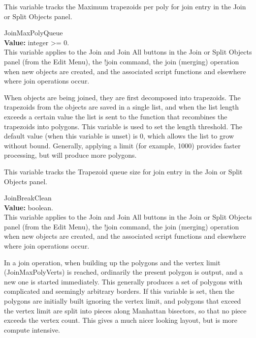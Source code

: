 \begin{description}
This variable tracks the {\cb Maximum trapezoids per poly for join}
entry in the {\cb Join or Split Objects} panel.

\item{\et JoinMaxPolyQueue}\\
{\bf Value:} integer {\vt >=} 0.\\
This variable applies to the {\cb Join} and {\cb Join All} buttons in
the {\cb Join or Split Objects} panel (from the {\cb Edit Menu}), the
{\cb !join} command, the join (merging) operation when new objects are
created, and the associated script functions and elsewhere where join
operations occur.

When objects are being joined, they are first decomposed into
trapezoids.  The trapezoids from the objects are saved in a single
list, and when the list length exceeds a certain value the list is
sent to the function that recombines the trapezoids into polygons. 
This variable is used to set the length threshold.  The default value
(when this variable is unset) is 0, which allows the list to grow
without bound.  Generally, applying a limit (for example, 1000)
provides faster processing, but will produce more polygons.

This variable tracks the {\cb Trapezoid queue size for join} entry in
the {\cb Join or Split Objects} panel.

\item{\et JoinBreakClean}\\
{\bf Value:} boolean.\\
This variable applies to the {\cb Join} and {\cb Join All} buttons in
the {\cb Join or Split Objects} panel (from the {\cb Edit Menu}), the
{\cb !join} command, the join (merging) operation when new objects are
created, and the associated script functions and elsewhere where join
operations occur.

In a join operation, when building up the polygons and the vertex
limit ({\et JoinMaxPolyVerts}) is reached, ordinarily the present
polygon is output, and a new one is started immediately.  This
generally produces a set of polygons with complicated and seemingly
arbitrary borders.  If this variable is set, then the polygons are
initially built ignoring the vertex limit, and polygons that exceed
the vertex limit are split into pieces along Manhattan bisectors, so
that no piece exceeds the vertex count.  This gives a much nicer
looking layout, but is more compute intensive.


\end{description}

